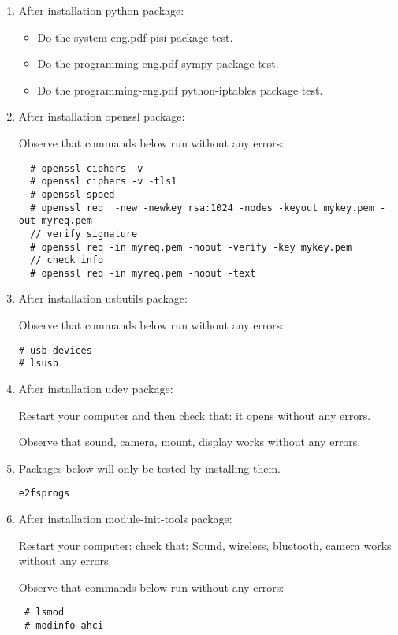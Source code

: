 \documentclass[a4paper,10pt]{article}
\begin{document}
\begin{enumerate}
\item After installation python package:
\begin{itemize}
 \item Do the system-eng.pdf pisi package test.
 \item Do the programming-eng.pdf sympy package test.
 \item Do the programming-eng.pdf python-iptables package test.
\end{itemize}


\item After installation  openssl package:

Observe that commands below run without any errors:
\begin{verbatim}
  # openssl ciphers -v 
  # openssl ciphers -v -tls1
  # openssl speed
  # openssl req  -new -newkey rsa:1024 -nodes -keyout mykey.pem -out myreq.pem
  // verify signature
  # openssl req -in myreq.pem -noout -verify -key mykey.pem
  // check info
  # openssl req -in myreq.pem -noout -text

\end{verbatim}


\item After installation  usbutils package:

Observe that commands below run without any errors:
\begin{verbatim}
# usb-devices
# lsusb
\end{verbatim}


\item After installation  udev package:

Restart your computer and then check that: it opens without any errors. 

Observe that sound, camera, mount, display works without any errors.
\item Packages below will only be tested by installing them.
\begin{verbatim}
e2fsprogs 
\end{verbatim}
\item After installation  module-init-tools package:

Restart your computer:
check that: Sound, wireless, bluetooth, camera works without any errors.

Observe that commands below run without any errors:
\begin{verbatim}
 # lsmod
 # modinfo ahci
\end{verbatim}



\end{enumerate}
\end{document}
